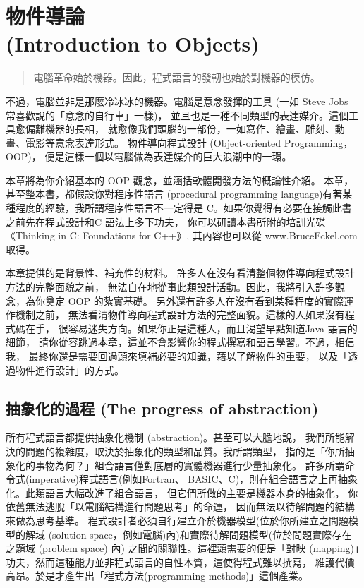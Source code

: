 
\chapter{物件導論\\(Introduction to Objects)}
\begin{verse}
電腦革命始於機器。因此，程式語言的發軔也始於對機器的模仿。
\end{verse}

不過，電腦並非是那麼冷冰冰的機器。電腦是意念發揮的工具
(一如 Steve Jobs 常喜歡說的「意念的自行車」一樣)，
並且也是一種不同類型的表達媒介。這個工具愈偏離機器的長相，
就愈像我們頭腦的一部份，一如寫作、繪畫、雕刻、動畫、電影等意念表達形式。
物件導向程式設計 (Object-oriented Programming，OOP)，
便是這樣一個以電腦做為表達媒介的巨大浪潮中的一環。

本章將為你介紹基本的 OOP 觀念，並涵括軟體開發方法的概論性介紹。
本章，甚至整本書，都假設你對程序性語言
(procedural programming language)有著某種程度的經驗，我所謂程序性語言不一定得是
C。如果你覺得有必要在接觸此書之前先在程式設計和C 語法上多下功夫，
你可以研讀本書所附的培訓光碟《Thinking in C: Foundations for C++》,
其內容也可以從 www.BruceEckel.com 取得。
 
本章提供的是背景性、補充性的材料。
許多人在沒有看清整個物件導向程式設計方法的完整面貌之前，
無法自在地從事此類設計活動。因此，我將引入許多觀念，為你奠定 OOP 的紮實基礎。
另外還有許多人在沒有看到某種程度的實際運作機制之前，
無法看清物件導向程式設計方法的完整面貌。這樣的人如果沒有程式碼在手，
很容易迷失方向。如果你正是這種人，而且渴望早點知道Java 語言的細節，
請你從容跳過本章，這並不會影響你的程式撰寫和語言學習。不過，相信我，
最終你還是需要回過頭來填補必要的知識，藉以了解物件的重要，
以及「透過物件進行設計」的方式。

\section{抽象化的過程 (The progress of abstraction)}
所有程式語言都提供抽象化機制 (abstraction)。甚至可以大膽地說，
我們所能解決的問題的複雜度，取決於抽象化的類型和品質。我所謂類型，
指的是「你所抽象化的事物為何？」組合語言僅對底層的實體機器進行少量抽象化。
許多所謂命令式(imperative)程式語言(例如Fortran、
BASIC、C)，則在組合語言之上再抽象化。此類語言大幅改進了組合語言，
但它們所做的主要是機器本身的抽象化，
你依舊無法逃脫「以電腦結構進行問題思考」的命運，
因而無法以待解問題的結構來做為思考基準。
程式設計者必須自行建立介於機器模型(位於你所建立之問題模型的解域
(solution space，例如電腦)內)和實際待解問題模型(位於問題實際存在之題域
(problem space) 內) 之間的關聯性。這裡頭需要的便是「對映
(mapping)」功夫，然而這種能力並非程式語言的自性本質，這使得程式難以撰寫，
維護代價高昂。於是才產生出「程式方法(programming methods)」這個產業。

